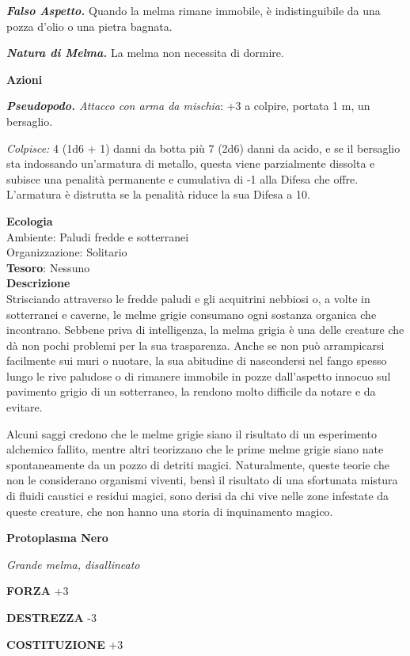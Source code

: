 \begin{multicols}{2}
\textit{\textbf{Falso Aspetto.}} Quando la melma rimane immobile, è indistinguibile da una pozza d'olio o una pietra bagnata.

\textit{\textbf{Natura di Melma.}} La melma non necessita di dormire.

\textbf{Azioni}

\textit{\textbf{Pseudopodo.} Attacco con arma da mischia}: +3 a colpire, portata 1 m, un bersaglio.

\textit{Colpisce:} 4 (1d6 + 1) danni da botta più 7 (2d6) danni da acido, e se il bersaglio sta indossando un'armatura di metallo, questa viene parzialmente dissolta e subisce una penalità permanente e cumulativa di -1 alla Difesa che offre. L'armatura è distrutta se la penalità riduce la sua Difesa a 10.

\textbf{Ecologia}\\
Ambiente: Paludi fredde e sotterranei\\
Organizzazione: Solitario\\
\textbf{Tesoro}: Nessuno\\
\textbf{Descrizione}\\
Strisciando attraverso le fredde paludi e gli acquitrini nebbiosi o, a volte in sotterranei e caverne, le melme grigie consumano ogni sostanza organica che incontrano. Sebbene priva di intelligenza, la melma grigia è una delle creature che dà non pochi problemi per la sua trasparenza. Anche se non può arrampicarsi facilmente sui muri o nuotare, la sua abitudine di nascondersi nel fango spesso lungo le rive paludose o di rimanere immobile in pozze dall'aspetto innocuo sul pavimento grigio di un sotterraneo, la rendono molto difficile da notare e da evitare.

Alcuni saggi credono che le melme grigie siano il risultato di un esperimento alchemico fallito, mentre altri teorizzano che le prime melme grigie siano nate spontaneamente da un pozzo di detriti magici. Naturalmente, queste teorie che non le considerano organismi viventi, bensì il risultato di una sfortunata mistura di fluidi caustici e residui magici, sono derisi da chi vive nelle zone infestate da queste creature, che non hanno una storia di inquinamento magico.


\medskip{}\textbf{Protoplasma Nero}

\textit{Grande melma, disallineato}

\textbf{FORZA} +3

\textbf{DESTREZZA} -3

\textbf{COSTITUZIONE} +3


\end{multicols}
